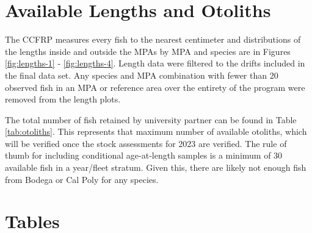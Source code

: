 \documentclass[
]{article}
\begin{document}
\hypertarget{available-lengths-and-otoliths}{%
\section{Available Lengths and Otoliths}\label{available-lengths-and-otoliths}}

The CCFRP measures every fish to the nearest centimeter and distributions of the
lengths inside and outside the MPAs by MPA and species are in Figures
\ref{fig:lengths-1} - \ref{fig:lengths-4}. Length data were
filtered to the drifts included in the final data set. Any species and MPA combination
with fewer than 20 observed fish in an MPA or reference area over the entirety
of the program were removed from the length plots.

The total number of fish retained by university partner can be found in Table
\ref{tab:otoliths}. This represents that maximum number of available otoliths,
which will be verified once the stock assessments for 2023 are verified. The
rule of thumb for including conditional age-at-length samples is a minimum of 30
available fish in a year/fleet stratum. Given this, there are likely not enough
fish from Bodega or Cal Poly for any species.

\FloatBarrier
\newpage

\hypertarget{tables}{%
\section{Tables}\label{tables}}

\FloatBarrier
\end{document}
